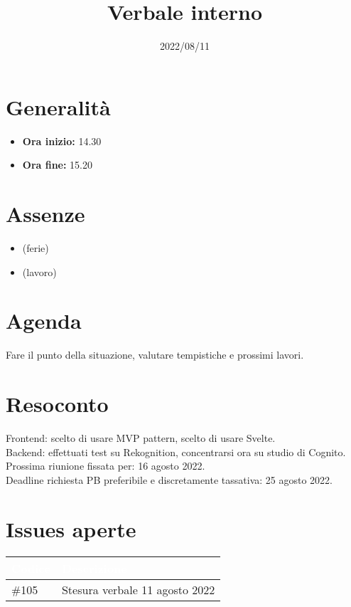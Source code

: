 \documentclass{classes/base}
\title{Verbale interno}
\date{2022/08/11}
\author{\marcob}
\renewcommand{\maketitle}{
    
}
\begin{document}
    \maketitle

    \section*{Generalità}
    \begin{itemize}
        \item \textbf{Ora inizio:} 14.30
        \item \textbf{Ora fine:} 15.20
    \end{itemize}

    \section*{Assenze}
    \begin{itemize}
        \item \marcov{} (ferie)
        \item \ruth{} (lavoro)
    \end{itemize}

    \section*{Agenda}
    Fare il punto della situazione, valutare tempistiche e prossimi lavori.

    \section*{Resoconto}
    Frontend: scelto di usare MVP pattern, scelto di usare Svelte.\\
    Backend: effettuati test su Rekognition, concentrarsi ora su studio di Cognito.\aCapo{}
    Prossima riunione fissata per: 16 agosto 2022.\\
    Deadline richiesta PB preferibile e discretamente tassativa: 25 agosto 2022.

    \section*{Issues aperte}
    {
        
        \newlength{\freewidth}
        \setlength{\freewidth}{\dimexpr\textwidth-10\tabcolsep}
        \renewcommand{\arraystretch}{1.5}
        \centering
        \setlength{\aboverulesep}{0pt}
        \setlength{\belowrulesep}{0pt}
        \begin{longtable}{C{.13\freewidth} C{\freewidth}}
            \toprule
        \textcolor{white}{\textbf{Codice}}&
        \textcolor{white}{\textbf{Descrizione}}\\	
        \toprule
        \endhead
        
        \#105 & Stesura verbale 11 agosto 2022 \\

        \bottomrule
        \end{longtable}
    }
\end{document}
